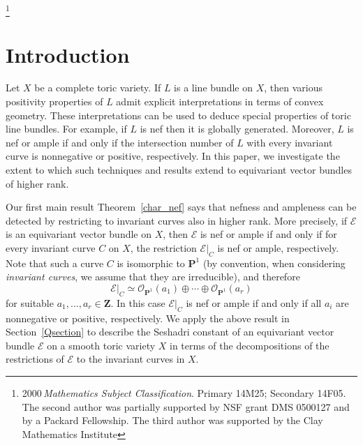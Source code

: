 \documentclass[12pt]{amsart}
\theoremstyle{definition}
\theoremstyle{remark}
\begin{document}
\thanks{2000\,\emph{Mathematics Subject Classification}.
 Primary 14M25; Secondary 14F05.
\newline The second author
  was partially supported by NSF grant
 DMS 0500127 and by a Packard Fellowship.
The third author was supported by the Clay Mathematics Institute}

\maketitle

\section{Introduction}

Let $X$ be a complete toric variety. If $L$ is a line bundle on $X$,
then various positivity properties of $L$ admit explicit
interpretations in terms of convex geometry. These interpretations can be
used to deduce special properties of toric line bundles. For
example, if $L$ is nef then it is globally generated. Moreover, $L$
is nef or ample if and only if the intersection number of $L$ with
every invariant curve is nonnegative or positive, respectively.  In this paper, we investigate the extent to which such techniques and results extend to equivariant vector bundles of higher rank.

Our first main result Theorem~\ref{char_nef} says that nefness and ampleness can be detected by
restricting to invariant curves also in higher rank. More precisely,
if ${\mathcal{E}}$ is an equivariant vector bundle on $X$, then ${\mathcal{E}}$ is nef or ample if and only if for every invariant curve $C$ on $X$, the
restriction ${\mathcal{E}}\vert_C$ is nef or ample, respectively. Note that such a curve $C$
is isomorphic to ${{\mathbf P}}^1$ (by convention, when considering \emph{invariant curves}, we assume that
they are irreducible), and therefore
$${\mathcal{E}}\vert_C\simeq{\mathcal{O}}_{{{\mathbf P}}^1}(a_1)\oplus\cdots\oplus{\mathcal{O}}_{{{\mathbf P}}^1}(a_r)$$
for suitable $a_1,\ldots,a_r\in{{\mathbf Z}}$. In this case ${\mathcal{E}}\vert_C$ is
nef or ample if and only if all $a_i$ are nonnegative or positive, respectively. We apply the above result in Section~\ref{Qsection} to describe the Seshadri
constant of an equivariant vector bundle ${\mathcal{E}}$ on a smooth toric
variety $X$ in terms of the decompositions of the restrictions of
${\mathcal{E}}$ to the invariant curves in $X$.
\end{document}
